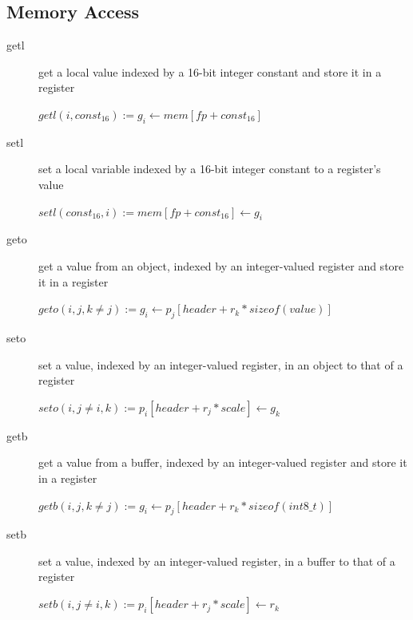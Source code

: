 \documentclass[english,a4paper]{article}
\begin{document}
\subsection{Memory Access}
\begin{description}
	\item[getl] get a local value indexed by a 16-bit integer 
	constant and
	store it in a register
	
	$getl(i, const_{16}):= g_{i} \longleftarrow mem[fp + const_{16}]$ 
	\\
	\item[setl] set a local variable indexed by a 16-bit integer 
	constant
	to a register's value
	
	$setl(const_{16}, i):= mem[fp + const_{16}] \longleftarrow g_{i}$ 
	\\
	\item[geto] get a value from an object, indexed by an 
	integer-valued
	register and store it in a register
	
	$geto(i, j, k\neq j):= g_{i} \longleftarrow p_{j}[header + 
	r_{k}*sizeof(value)]$ \\
	\item[seto] set a value, indexed by an integer-valued register, 
	in an
	object to that of a register
	
	$seto(i, j \neq i, k):= p_{i}[header + r_{j}*scale] 
	\longleftarrow g_{k}$ \\
	\item[getb] get a value from a buffer, indexed by an 
	integer-valued
	register and store it in a register
	
	$getb(i, j, k\neq j):= g_{i} \longleftarrow p_{j}[header + 
	r_{k}*sizeof(int8\_t)]$ \\
	\item[setb] set a value, indexed by an integer-valued register, 
	in a
	buffer to that of a register
	
	$setb(i, j \neq i, k):= p_{i}[header + r_{j}*scale] 
	\longleftarrow r_{k}$ \\
\end{description}
\end{document}
